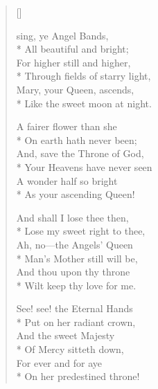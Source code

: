 \newHymn


\begin{verse}[\versewidth]

\begin{altverse}
 sing, ye Angel Bands,\\*
All beautiful and bright;\\
For higher still and higher,\\*
Through fields of starry light,\\
Mary, your Queen, ascends,\\*
Like the sweet moon at night.
\end{altverse}

\begin{altverse}
A fairer flower than she\\*
On earth hath never been;\\
And, save the Throne of God,\\*
Your Heavens have never seen\\
A wonder half so bright\\*
As your ascending Queen!
\end{altverse}

\begin{altverse}
And shall I lose thee then,\\*
Lose my sweet right to thee,\\
Ah, no---the Angels' Queen\\*
Man's Mother still will be,\\
And thou upon thy throne\\*
Wilt keep thy love for me.
\end{altverse}

\begin{altverse}
See! see! the Eternal Hands\\*
Put on her radiant crown,\\
And the sweet Majesty\\*
Of Mercy sitteth down,\\
For ever and for aye\\*
On her predestined throne!
\end{altverse}


\end{verse}


